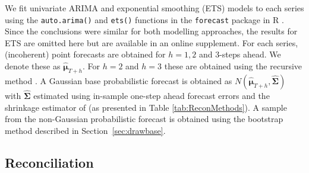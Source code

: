 \documentclass[12pt]{article}
\theoremstyle{definition}
\begin{document}
We fit univariate ARIMA and exponential smoothing (ETS) models to each series using the \verb|auto.arima()| and \verb|ets()| functions in the \verb|forecast| package \citep{Rforecast} in R \citep{Rcore}.  Since the conclusions were similar for both modelling approaches, the results for ETS are omitted here but are available in an online supplement.  For each series, (incoherent) point forecasts are obtained for $h = 1, 2$ and $3$-steps ahead.  We denote these as $\hat{\bm\mu}_{T+h}$. For $h=2$ and $h=3$ these are obtained using the recursive method \citep{FPP2018}.  A Gaussian base probabilistic forecast is obtained as $N(\hat{\bm{\mu}}_{T+h},\hat{\bm{\Sigma}})$ with $\hat{\bm{\Sigma}}$ estimated using in-sample one-step ahead forecast errors and the shrinkage estimator of \citet{Schafer2005} (as presented in Table \ref{tab:ReconMethods}).  A sample from the non-Gaussian probabilistic forecast is obtained using the bootstrap method described in Section~\ref{sec:drawbase}.

\subsection{Reconciliation}
\end{document}
